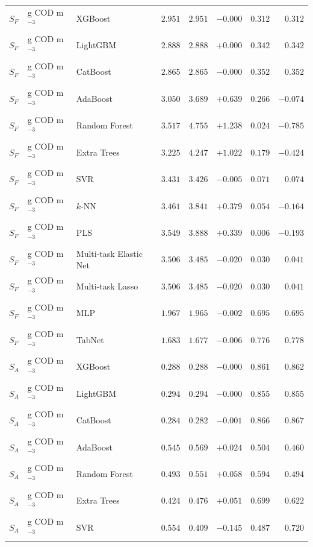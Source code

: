 \begin{longtable}{llp{3.1cm}rrrrr}
$S_{F}$ & g COD m$^{-3}$ & XGBoost & $2.951$ & $2.951$ & $-0.000$ & $0.312$ & $0.312$ \\
$S_{F}$ & g COD m$^{-3}$ & LightGBM & $2.888$ & $2.888$ & $+0.000$ & $0.342$ & $0.342$ \\
$S_{F}$ & g COD m$^{-3}$ & CatBoost & $2.865$ & $2.865$ & $-0.000$ & $0.352$ & $0.352$ \\
$S_{F}$ & g COD m$^{-3}$ & AdaBoost & $3.050$ & $3.689$ & $+0.639$ & $0.266$ & $-0.074$ \\
$S_{F}$ & g COD m$^{-3}$ & Random Forest & $3.517$ & $4.755$ & $+1.238$ & $0.024$ & $-0.785$ \\
$S_{F}$ & g COD m$^{-3}$ & Extra Trees & $3.225$ & $4.247$ & $+1.022$ & $0.179$ & $-0.424$ \\
$S_{F}$ & g COD m$^{-3}$ & SVR & $3.431$ & $3.426$ & $-0.005$ & $0.071$ & $0.074$ \\
$S_{F}$ & g COD m$^{-3}$ & $k$-NN & $3.461$ & $3.841$ & $+0.379$ & $0.054$ & $-0.164$ \\
$S_{F}$ & g COD m$^{-3}$ & PLS & $3.549$ & $3.888$ & $+0.339$ & $0.006$ & $-0.193$ \\
$S_{F}$ & g COD m$^{-3}$ & Multi-task Elastic Net & $3.506$ & $3.485$ & $-0.020$ & $0.030$ & $0.041$ \\
$S_{F}$ & g COD m$^{-3}$ & Multi-task Lasso & $3.506$ & $3.485$ & $-0.020$ & $0.030$ & $0.041$ \\
$S_{F}$ & g COD m$^{-3}$ & MLP & $1.967$ & $1.965$ & $-0.002$ & $0.695$ & $0.695$ \\
$S_{F}$ & g COD m$^{-3}$ & TabNet & $1.683$ & $1.677$ & $-0.006$ & $0.776$ & $0.778$ \\
$S_{A}$ & g COD m$^{-3}$ & XGBoost & $0.288$ & $0.288$ & $-0.000$ & $0.861$ & $0.862$ \\
$S_{A}$ & g COD m$^{-3}$ & LightGBM & $0.294$ & $0.294$ & $-0.000$ & $0.855$ & $0.855$ \\
$S_{A}$ & g COD m$^{-3}$ & CatBoost & $0.284$ & $0.282$ & $-0.001$ & $0.866$ & $0.867$ \\
$S_{A}$ & g COD m$^{-3}$ & AdaBoost & $0.545$ & $0.569$ & $+0.024$ & $0.504$ & $0.460$ \\
$S_{A}$ & g COD m$^{-3}$ & Random Forest & $0.493$ & $0.551$ & $+0.058$ & $0.594$ & $0.494$ \\
$S_{A}$ & g COD m$^{-3}$ & Extra Trees & $0.424$ & $0.476$ & $+0.051$ & $0.699$ & $0.622$ \\
$S_{A}$ & g COD m$^{-3}$ & SVR & $0.554$ & $0.409$ & $-0.145$ & $0.487$ & $0.720$ \\

\end{longtable}
